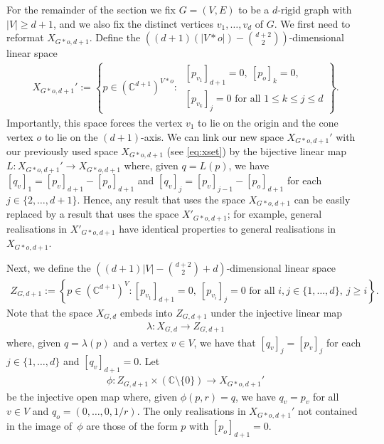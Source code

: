 \documentclass[ALCO]{cedram}
\begin{document}
For the remainder of the section we fix $G=(V,E)$ to be a $d$-rigid graph with $|V| \geq d+1$,
and we also fix the distinct vertices $v_1,\ldots, v_d$ of $G$.
We first need to reformat $X_{G*o,d+1}$.
Define the $((d+1)(|V*o|) - \binom{d+2}{2})$-dimensional linear space
\begin{align*}
	X_{G*o,d+1}' := \left\{  p \in (\mathbb{C}^{d+1})^{V*o} :
		\begin{array}{l}
			\ [p_{v_1}]_{d+1} = 0, ~ [p_o]_k = 0, \\
			\ [p_{v_k}]_j = 0 \text{ for all }  1 \leq k \leq j \leq d
		\end{array}
	\right\}.
\end{align*}
Importantly,
this space forces the vertex $v_1$ to lie on the origin and the cone vertex $o$ to lie on the $(d+1)$-axis.
We can link our new space $X_{G*o,d+1}'$ with our previously used space $X_{G*o,d+1}$ (see \eqref{eq:xset}) by the bijective linear map $L :X_{G*o,d+1}' \rightarrow X_{G*o,d+1}$ where, given $q=L(p)$,
we have $[q_v]_1 = [p_v]_{d+1} - [p_o]_{d+1}$ and $[q_v]_j = [p_v]_{j-1} - [p_o]_{d+1}$ for each $j \in \{2,\ldots, d+1\}$.
Hence, any result that uses the space $X_{G*o,d+1}$ can be easily replaced by a result that uses the space $X'_{G*o,d+1}$;
for example,
general realisations in $X'_{G*o,d+1}$ have identical properties to general realisations in $X_{G*o,d+1}$.

Next,
we define the $((d+1)|V| - \binom{d+2}{2} + d)$-dimensional linear space
\begin{align*}
	Z_{G,d+1} := \left\{  p \in (\mathbb{C}^{d+1})^{V} :  [p_{v_1}]_{d+1} = 0, ~[p_{v_i}]_j = 0 \text{ for all } i, j \in \{1,\ldots, d\}, ~ j \geq i \right\}.
\end{align*}
Note that the space $X_{G,d}$ embeds into $Z_{G,d+1}$ under the injective linear map 
\begin{align*}
	\lambda: X_{G,d} \rightarrow Z_{G,d+1}
\end{align*}
where, given $q= \lambda(p)$ and a vertex $v \in V$,
we have that $[q_v]_j = [p_v]_j$ for each $j \in \{1,\ldots,d\}$ and $[q_v]_{d+1} = 0$.
Let 
\begin{align*}
	\phi: Z_{G,d+1} \times (\mathbb{C}\setminus \{0\}) \rightarrow X_{G*o,d+1}'
\end{align*}
be the injective open map where,
given $\phi(p,r) = q$,
we have $q_v = p_v$ for all $v \in V$ and $q_o = (0 , \ldots, 0, 1/r)$.
The only realisations in $X_{G*o,d+1}'$ not contained in the image of~$\phi$ are those of the form $p$ with $[p_o]_{d+1} = 0$.
\end{document}
